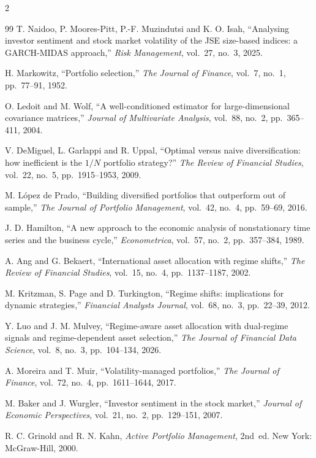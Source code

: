 \begin{footnotesize}
\begin{multicols}{2}
\begin{thebibliography}{99}
 T. Naidoo, P. Moores-Pitt, P.-F. Muzindutsi and K. O. Isah,
``Analysing investor sentiment and stock market volatility of the JSE size-based indices:
a GARCH-MIDAS approach,'' \emph{Risk Management}, vol.~27, no.~3, 2025.

 H. Markowitz, ``Portfolio selection,'' \emph{The Journal of
Finance}, vol.~7, no.~1, pp.~77--91, 1952.

 O. Ledoit and M. Wolf, ``A well-conditioned estimator for
large-dimensional covariance matrices,'' \emph{Journal of Multivariate Analysis}, vol.~88,
no.~2, pp.~365--411, 2004.

 V. DeMiguel, L. Garlappi and R. Uppal, ``Optimal versus naive
diversification: how inefficient is the $1/N$ portfolio strategy?'' \emph{The Review of
Financial Studies}, vol.~22, no.~5, pp.~1915--1953, 2009.

 M. L\'opez de Prado, ``Building diversified portfolios that
outperform out of sample,'' \emph{The Journal of Portfolio Management}, vol.~42, no.~4,
pp.~59--69, 2016.

 J. D. Hamilton, ``A new approach to the economic analysis of
nonstationary time series and the business cycle,'' \emph{Econometrica}, vol.~57, no.~2,
pp.~357--384, 1989.

 A. Ang and G. Bekaert, ``International asset allocation with regime
shifts,'' \emph{The Review of Financial Studies}, vol.~15, no.~4, pp.~1137--1187, 2002.

 M. Kritzman, S. Page and D. Turkington, ``Regime shifts:
implications for dynamic strategies,'' \emph{Financial Analysts Journal}, vol.~68, no.~3,
pp.~22--39, 2012.

 Y. Luo and J. M. Mulvey, ``Regime-aware asset allocation with
dual-regime signals and regime-dependent asset selection,'' \emph{The Journal of Financial
Data Science}, vol.~8, no.~3, pp.~104--134, 2026.

 A. Moreira and T. Muir, ``Volatility-managed portfolios,'' \emph{The
Journal of Finance}, vol.~72, no.~4, pp.~1611--1644, 2017.

 M. Baker and J. Wurgler, ``Investor sentiment in the stock
market,'' \emph{Journal of Economic Perspectives}, vol.~21, no.~2, pp.~129--151, 2007.

 R. C. Grinold and R. N. Kahn, \emph{Active Portfolio Management},
2nd~ed. New York: McGraw-Hill, 2000.


\end{thebibliography}
\end{multicols}
\end{footnotesize}
